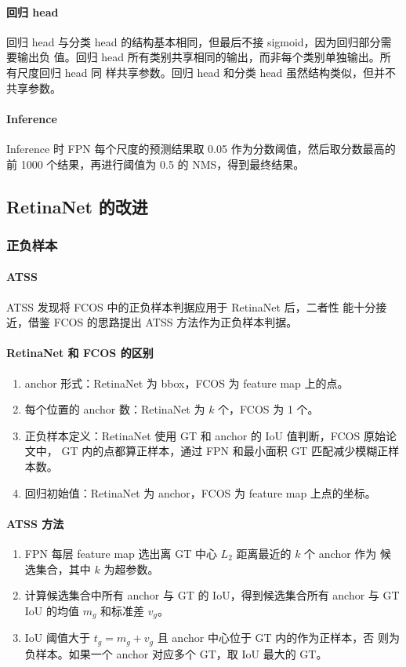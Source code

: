 \paragraph{回归 head}
回归 head 与分类 head 的结构基本相同，但最后不接 sigmoid，因为回归部分需要输出负
值。回归 head 所有类别共享相同的输出，而非每个类别单独输出。所有尺度回归 head 同
样共享参数。回归 head 和分类 head 虽然结构类似，但并不共享参数。

\paragraph{Inference}
Inference 时 FPN 每个尺度的预测结果取 0.05 作为分数阈值，然后取分数最高的前 1000
个结果，再进行阈值为 0.5 的 NMS，得到最终结果。

\subsection{RetinaNet 的改进}

\subsubsection{正负样本}
\paragraph{ATSS}
ATSS 发现将 FCOS\cite{2019-FCOS} 中的正负样本判据应用于 RetinaNet 后，二者性
能十分接近，借鉴 FCOS 的思路提出 ATSS 方法作为正负样本判据。

\paragraph{RetinaNet 和 FCOS 的区别}
\begin{enumerate}
  \item anchor 形式：RetinaNet 为 bbox，FCOS 为 feature map 上的点。
  \item 每个位置的 anchor 数：RetinaNet 为 $k$ 个，FCOS 为 1 个。
  \item 正负样本定义：RetinaNet 使用 GT 和 anchor 的 IoU 值判断，FCOS 原始论文中，
    GT 内的点都算正样本，通过 FPN 和最小面积 GT 匹配减少模糊正样本数。
  \item 回归初始值：RetinaNet 为 anchor，FCOS 为 feature map 上点的坐标。
\end{enumerate}

\paragraph{ATSS 方法}
\begin{enumerate}
  \item FPN 每层 feature map 选出离 GT 中心 $L_2$ 距离最近的 $k$ 个 anchor 作为
    候选集合，其中 $k$ 为超参数。
  \item 计算候选集合中所有 anchor 与 GT 的 IoU，得到候选集合所有 anchor 与 GT IoU 的均值 $m_g$ 和标准差 $v_g$。
  \item IoU 阈值大于 $t_g = m_g + v_g$ 且 anchor 中心位于 GT 内的作为正样本，否
    则为负样本。如果一个 anchor 对应多个 GT，取 IoU 最大的 GT。
\end{enumerate}

